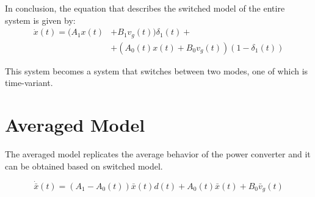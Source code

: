 \documentclass[DIV=calc, paper=a4, fontsize=11pt, twocolumn]{scrartcl}	 %
\begin{document}
In conclusion, the equation that describes the switched model of the entire system is given by:
\begin{align*}
\dot{x}(t) = (A_1 x(t) &+ B_1 v_g(t))\delta_1(t) + \\ &+ (A_0(t) x(t) + B_0 v_g(t))(1 - \delta_1(t))
\end{align*}

This system becomes a system that switches between two modes, one of which is time-variant.

\section{Averaged Model}
The averaged model replicates the average behavior of the power converter and it can be obtained based on switched model.

\begin{equation}
\dot{\bar{x}}(t) = (A_1 - A_0(t))\bar{x}(t) d(t) + A_0(t) \bar{x}(t) + B_0 \bar{v}_g(t)
\end{equation}
\end{document}
